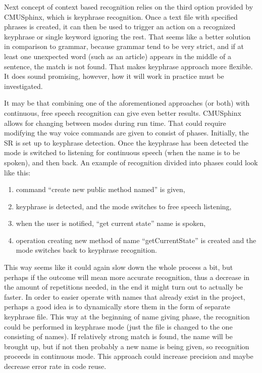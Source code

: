 Next concept of context based recognition relies on the third option provided by CMUSphinx, which is keyphrase recognition. Once a text file with specified phrases is created, it can then be used to trigger an action on a recognized keyphrase or single keyword ignoring the rest. That seems like a better solution in comparison to grammar, because grammar tend to be very strict, and if at least one unexpected word (such as an article) appears in the middle of a sentence, the match is not found. That makes keyphrase approach more flexible. It does sound promising, however, how it will work in practice must be investigated. 

It may be that combining one of the aforementioned approaches (or both) with continuous, free speech recognition can give even better results. CMUSphinx allows for changing between modes during run time. That could require modifying the way voice commands are given to consist of phases. Initially, the SR is set up to keyphrase detection. Once the keyphrase has been detected the mode is switched to listening for continuous speech (when the name is to be spoken), and then back. An example of recognition divided into phases could look like this:
\begin{enumerate}
    \item command ``create new public method named'' is given,
    \item keyphrase is detected, and the mode switches to free speech listening,
    \item when the user is notified, ``get current state'' name is spoken,
    \item operation creating new method of name ``getCurrentState'' is created and the mode switches back to keyphrase recognition.
\end{enumerate}
This way seems like it could again slow down the whole process a bit, but perhaps if the outcome will mean more accurate recognition, thus a decrease in the amount of repetitions needed, in the end it might turn out to actually be faster.
In order to easier operate with names that already exist in the project, perhaps a good idea is to dynamically store them in the form of separate keyphrase file. This way at the beginning of name giving phase, the recognition could be performed in keyphrase mode (just the file is changed to the one consisting of names). If relatively strong match is found, the name will be brought up, but if not then probably a new name is being given, so recognition proceeds in continuous mode. This approach could increase precision and maybe decrease error rate in code reuse.

